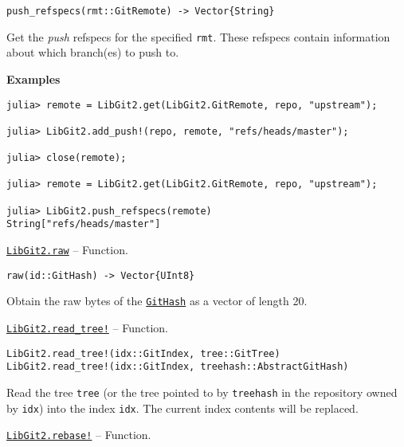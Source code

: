 \begin{adjustwidth}{2em}{0pt}


\begin{verbatim}
push_refspecs(rmt::GitRemote) -> Vector{String}
\end{verbatim}

Get the \emph{push} refspecs for the specified \texttt{rmt}. These refspecs contain information about which branch(es) to push to.

\textbf{Examples}


\begin{verbatim}
julia> remote = LibGit2.get(LibGit2.GitRemote, repo, "upstream");

julia> LibGit2.add_push!(repo, remote, "refs/heads/master");

julia> close(remote);

julia> remote = LibGit2.get(LibGit2.GitRemote, repo, "upstream");

julia> LibGit2.push_refspecs(remote)
String["refs/heads/master"]
\end{verbatim}



\end{adjustwidth}
\hypertarget{17280494735661401954}{}
\hyperlink{17280494735661401954}{\texttt{LibGit2.raw}}  -- {Function.}

\begin{adjustwidth}{2em}{0pt}


\begin{verbatim}
raw(id::GitHash) -> Vector{UInt8}
\end{verbatim}

Obtain the raw bytes of the \hyperlink{202290709580230708}{\texttt{GitHash}} as a vector of length 20.



\end{adjustwidth}
\hypertarget{8133295290894494359}{}
\hyperlink{8133295290894494359}{\texttt{LibGit2.read\_tree!}}  -- {Function.}

\begin{adjustwidth}{2em}{0pt}


\begin{verbatim}
LibGit2.read_tree!(idx::GitIndex, tree::GitTree)
LibGit2.read_tree!(idx::GitIndex, treehash::AbstractGitHash)
\end{verbatim}

Read the tree \texttt{tree} (or the tree pointed to by \texttt{treehash} in the repository owned by \texttt{idx}) into the index \texttt{idx}. The current index contents will be replaced.



\end{adjustwidth}
\hypertarget{14810332437858061232}{}
\hyperlink{14810332437858061232}{\texttt{LibGit2.rebase!}}  -- {Function.}

